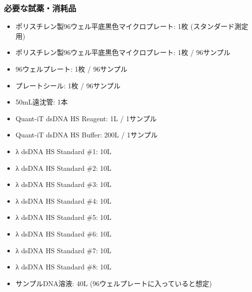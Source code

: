 \documentclass[titlepage,10pt,a4paper,uplatex]{jsbook}
\begin{document}
\subsubsection{必要な試薬・消耗品}
\begin{itemize}
\item ポリスチレン製96ウェル平底黒色マイクロプレート: 1枚 (スタンダード測定用)
\item ポリスチレン製96ウェル平底黒色マイクロプレート: 1枚 / 96サンプル
\item 96ウェルプレート: 1枚 / 96サンプル
\item プレートシール: 1枚 / 96サンプル
\item 50mL遠沈管: 1本
\item Quant-iT dsDNA HS Reagent: 1{\textmu}L / 1サンプル
\item Quant-iT dsDNA HS Buffer: 200{\textmu}L / 1サンプル
\item λ dsDNA HS Standard \#1: 10{\textmu}L
\item λ dsDNA HS Standard \#2: 10{\textmu}L
\item λ dsDNA HS Standard \#3: 10{\textmu}L
\item λ dsDNA HS Standard \#4: 10{\textmu}L
\item λ dsDNA HS Standard \#5: 10{\textmu}L
\item λ dsDNA HS Standard \#6: 10{\textmu}L
\item λ dsDNA HS Standard \#7: 10{\textmu}L
\item λ dsDNA HS Standard \#8: 10{\textmu}L
\item サンプルDNA溶液: 40{\textmu}L (96ウェルプレートに入っていると想定)
\end{itemize}
\end{document}

